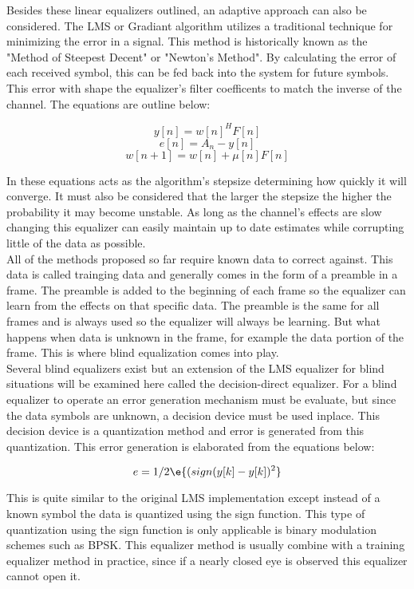 \documentclass[11pt]{mvlthesis}
\begin{document}
Besides these linear equalizers outlined, an adaptive approach can also be considered.  The LMS or Gradiant algorithm utilizes a traditional technique for minimizing the error in a signal.  This method is historically known as the "Method of Steepest Decent" or "Newton's Method". By calculating the error of each received symbol, this can be fed back into the system for future symbols.  This error with shape the equalizer's filter coefficents to match the inverse of the channel.  The equations are outline below:

\[ y[n]=w[n]^{H}F[n]\]
\[ e[n]=A_{n}-y[n]\]
\[ w[n+1]=w[n]+\mu[n]F[n]\] 

In these equations \mu acts as the algorithm's stepsize determining how quickly it will converge.  It must also be considered that the larger the stepsize the higher the probability it may become unstable.  As long as the channel's effects are slow changing this equalizer can easily maintain up to date estimates while corrupting little of the data as possible.\\  

All of the methods proposed so far require known data to correct against.  This data is called trainging data and generally comes in the form of a preamble in a frame.  The preamble is added to the beginning of each frame so the equalizer can learn from the effects on that specific data.  The preamble is the same for all frames and is always used so the equalizer will always be learning.  But what happens when data is unknown in the frame, for example the data portion of the frame.  This is where blind equalization comes into play.\\

Several blind equalizers exist but an extension of the LMS equalizer for blind situations will be examined here called the decision-direct equalizer.  For a blind equalizer to operate an error generation mechanism must be evaluate, but since the data symbols are unknown, a decision device must be used inplace.  This decision device is a quantization method and error is generated from this quantization.  This error generation is elaborated from the equations below:

\[ e = 1/2\e{(sign(y[k]-y[k])^{2}}\]

This is quite similar to the original LMS implementation except instead of a known symbol the data is quantized using the sign function.  This type of quantization using the sign function is only applicable is binary modulation schemes such as BPSK.  This equalizer method is usually combine with a training equalizer method in practice, since if a nearly closed eye is observed this equalizer cannot open it.\\
\end{document}
